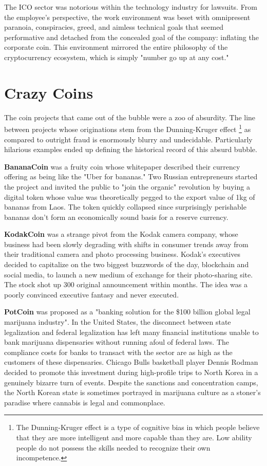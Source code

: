 The ICO sector was notorious within the technology industry for lawsuits. From
the employee's perspective, the work environment was beset with omnipresent
paranoia, conspiracies, greed, and aimless technical goals that seemed
performative and detached from the concealed goal of the company: inflating the
corporate coin. This environment mirrored the entire philosophy of the
cryptocurrency ecosystem, which is simply "number go up at any cost."

\section{Crazy Coins}

The coin projects that came out of the bubble were a zoo of absurdity. The line
between projects whose originations stem from the Dunning-Kruger effect
\footnote{The Dunning-Kruger effect is a type of cognitive bias in which people
believe that they are more intelligent and more capable than they are. Low
ability people do not possess the skills needed to recognize their own
incompetence.} as compared to outright fraud is enormously blurry and
undecidable. Particularly hilarious examples ended up defining the historical
record of this absurd bubble.

\textbf{BananaCoin} was a fruity coin whose whitepaper described their currency
offering as being like the "Uber for bananas." Two Russian entrepreneurs started
the project and invited the public to "join the organic" revolution by buying a
digital token whose value was theoretically pegged to the export value of 1kg of
bananas from Laos. The token quickly collapsed since surprisingly perishable
bananas don't form an economically sound basis for a reserve currency.

\textbf{KodakCoin} was a strange pivot from the Kodak camera company, whose
business had been slowly degrading with shifts in consumer trends away from
their traditional camera and photo processing business. Kodak's executives
decided to capitalize on the two biggest buzzwords of the day, blockchain and
social media, to launch a new medium of exchange for their photo-sharing site.
The stock shot up 300%
original announcement within months. The idea was a poorly convinced executive
fantasy and never executed.

\textbf{PotCoin} was proposed as a "banking solution for the \$100 billion
global legal marijuana industry". In the United States, the disconnect between
state legalization and federal legalization has left many financial institutions
unable to bank marijuana dispensaries without running afoul of federal laws. The
compliance costs for banks to transact with the sector are as high as the
customers of these dispensaries. Chicago Bulls basketball player Dennis Rodman
decided to promote this investment during high-profile trips to North Korea in a
genuinely bizarre turn of events. Despite the sanctions and concentration camps,
the North Korean state is sometimes portrayed in marijuana culture as a stoner's
paradise where cannabis is legal and commonplace.

